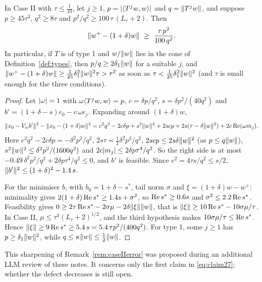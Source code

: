 \begin{proposition}\label{prop:27false}\stproved{}
In Case II with $\tau\le\frac1{10}$, let $j\ge1$, $p=\lvert \langle T^jw,w\rangle\rvert$ and $q=\lVert T^jw\rVert$,
and suppose $p\ge45\tau^3$, $q^2\ge8\tau$ and $p^2/q^2\ge100\,\tau\,(L_\tau+2)$. Then
\[
\norm{w^+-(1+\delta)w}\ \ge\ \frac{\tau\,p^2}{100\,q^2}.
\]
In particular, if $T$ is of type 1 and $w/\lVert w\rVert$ lies in the cone of
Definition~\ref{def:types}, then $p/q\ge2\delta_1\lVert w\rVert$ for a suitable $j$, and
$\lVert w^+-(1+\delta)w\rVert\ge\frac1{25}\delta_1^2\lVert w\rVert^2\tau>\tau^2$ as soon as
$\tau<\frac1{25}\delta_1^2\lVert w\rVert^2$ (and $\tau$ is small enough for the three conditions).
\end{proposition}
\begin{proof}
Let $\lvert \omega\rvert=1$ with $\omega\langle T^jw,w\rangle=p$, $c=\delta p/q^2$, $s=\delta p^2/(40q^2)$ and
$b'=(1+\delta-s)e_0-c\,\omega e_j$. Expanding around $(1+\delta)w$,
\[
\lVert x_0-V_wb'\rVert^2-\lVert x_0-(1+\delta)w\rVert^2
=c^2q^2-2c\delta p+s^2\lVert w\rVert^2+2scp+2s(\tau-\delta\lVert w\rVert^2)+2c\operatorname{Re}(\omega m_j).
\]
Here $c^2q^2-2c\delta p=-\delta^2p^2/q^2$, $2s\tau=\frac12\delta^2p^2/q^2$,
$2scp\le2s\delta\lVert w\rVert^2$ (as $p\le q\lVert w\rVert$), $s^2\lVert w\rVert^2\le\delta^2p^2/(1600q^2)$ and
$2c\lvert m_j\rvert\le2\delta p\tau^4/q^2$. So the right side is at most
$-0.49\,\delta^2p^2/q^2+2\delta p\tau^4/q^2\le0$, and $b'$ is feasible. Since
$c^2=4\tau s/q^2\le s/2$, $\lVert b'\rVert^2\le(1+\delta)^2-1.4\,s$.

For the minimiser $b$, with $b_0=1+\delta-s^*$, tail norm $\sigma$ and
$\xi=(1+\delta)w-w^+$: minimality gives $2(1+\delta)\operatorname{Re} s^*\ge1.4s+\sigma^2$, so
$\operatorname{Re} s^*\ge0.6s$ and $\sigma^2\le2.2\operatorname{Re} s^*$. Feasibility gives
$0\ge2\tau\operatorname{Re} s^*-2\sigma\mu-2\delta\lVert \xi\rVert\lVert w\rVert$, that is
$\lVert \xi\rVert\ge10\operatorname{Re} s^*-10\sigma\mu/\tau$. In Case II, $\mu\le\tau^4(L_\tau+2)^{1/2}$, and the
third hypothesis makes $10\sigma\mu/\tau\le\operatorname{Re} s^*$. Hence
$\lVert \xi\rVert\ge9\operatorname{Re} s^*\ge5.4\,s=5.4\,\tau p^2/(400q^2)$.
For type 1, some $j\ge1$ has $p\ge\delta_1\lVert w\rVert^2$, while $q\le\kappa\lVert w\rVert\le\frac12\lVert w\rVert$.
\end{proof}

This sharpening of Remark~\ref{rem:caseIIerror} was proposed during an additional LLM review of these
notes. It concerns only the first claim in \eqref{eq:claim27}; whether the defect decreases is
still open.

